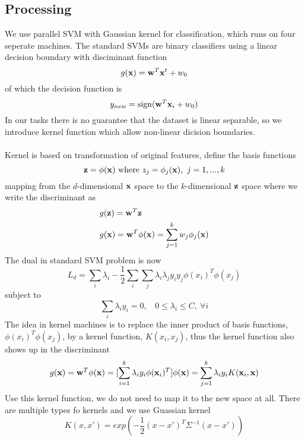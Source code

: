 \documentclass[a4paper]{article}
\newcommand{\vw}{{\bf w}}
\newcommand{\vx}{{\bf x}}
\newcommand{\vz}{{\bf z}}
\begin{document}
\subsection{Processing}
We use parallel SVM with Gaussian kernel for classification, which runs on four seperate machines. The standard SVMs are binary classifiers using a linear decision boundary with disciminant function \begin{equation}
g(\vx)=\vw^T\vx^t+w_0
\end{equation}
of which the decision function is \begin{equation}
y_{new}=\text{sign}(\vw^T\vx_i+w_0)
\end{equation}
In our tasks there is no guarantee that the dataset is linear separable, so we introduce kernel function which allow non-linear dicision boundaries.\\
\\
Kernel is based on transformation of original features, define the basis functions \begin{equation}
\vz =\phi(\vx)~\text{where}~z_j=\phi_j(\vx),~j = 1,...,k
\end{equation}
mapping from the $d$-dimensional $\vx$ space to the $k$-dimensional $\vz$ space where we write the discriminant as\begin{eqnarray}
&g(\vz)=\vw^T\vz\\
&g(\vx)=\vw^T\phi(\vx)=\sum_{j=1}^k w_j\phi_j(\vx)
\end{eqnarray}
The dual in standard SVM problem is now
\begin{equation}
L_d=\sum_i\lambda_i-\frac{1}{2}\sum\limits_i\sum\limits_j \lambda_i\lambda_j y_i y_j \phi(x_i)^T \phi(x_j)
\end{equation}
subject to \begin{equation}
\sum_i \lambda_iy_i=0,~~~~0\leq \lambda_i\leq C,~\forall i
\end{equation}
The idea in kernel machines is to replace the inner product of basis functions, $\phi(x_i)^T\phi(x_j)$, by a kernel function, $K(x_i,x_j)$, thus the kernel function also shows up in the discriminant
\begin{equation}
g(\vx)=\vw^T\phi(\vx)=[\sum_{i=1}^k \lambda_i y_i \phi(\vx_i)^T]\phi(\vx)=\sum_{j=1}^k \lambda_i y_i K(\vx_i,\vx)
\end{equation}
Use this kernel function, we do not need to map it to the new space at all. There are multiple types fo kernels and we use Guassian kernel  \begin{equation}
K(x,x')=exp(-\frac{1}{2}(x-x')^T\Sigma^{-1}(x-x'))
\end{equation}
\end{document}
